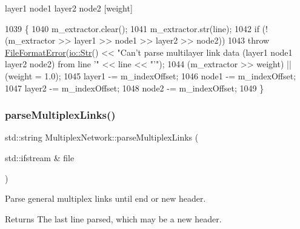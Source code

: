 layer1 node1 layer2 node2 \mbox{[}weight\mbox{]} 
\begin{DoxyCode}
1039 \{
1040     m\_extractor.clear();
1041     m\_extractor.str(line);
1042     \textcolor{keywordflow}{if} (!(m\_extractor >> layer1 >> node1 >> layer2 >> node2))
1043         \textcolor{keywordflow}{throw} \mbox{\hyperlink{classFileFormatError}{FileFormatError}}(\mbox{\hyperlink{classio_1_1Str}{io::Str}}() << \textcolor{stringliteral}{"Can't parse multilayer link data (layer1
       node1 layer2 node2) from line '"} << line << \textcolor{stringliteral}{"'"});
1044     (m\_extractor >> weight) || (weight = 1.0);
1045     layer1 -= m\_indexOffset;
1046     node1 -= m\_indexOffset;
1047     layer2 -= m\_indexOffset;
1048     node2 -= m\_indexOffset;
1049 \}
\end{DoxyCode}
\mbox{\label{classMultiplexNetwork_ad881d099c442d8e2ad242f357a3f97d7}} 
\subsubsection{\texorpdfstring{parse\+Multiplex\+Links()}{parseMultiplexLinks()}}
{\footnotesize\ttfamily std\+::string Multiplex\+Network\+::parse\+Multiplex\+Links (\begin{DoxyParamCaption}\item[{std\+::ifstream \&}]{file }\end{DoxyParamCaption})\hspace{0.3cm}{\ttfamily [protected]}}

Parse general multiplex links until end or new header. \begin{DoxyReturn}{Returns}
The last line parsed, which may be a new header. 
\end{DoxyReturn}

